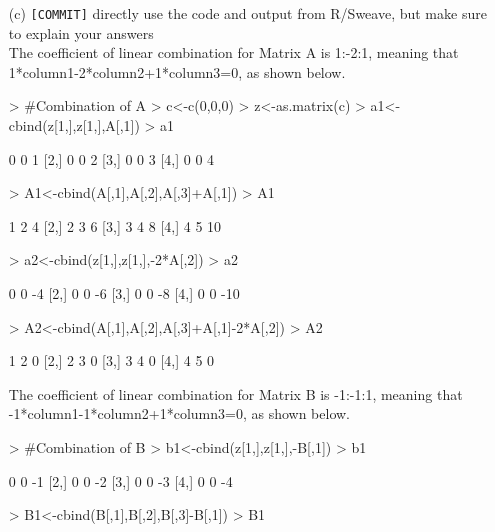 \documentclass[12pt]{article}
\begin{document}
\begin{itemize}
    \item[(c)] \verb+[COMMIT]+   directly use the code and output from R/Sweave, but make sure
        to explain your answers\\
The coefficient of linear combination for Matrix A is 1:-2:1, meaning that 1*column1-2*column2+1*column3=0, as shown below.
\begin{Schunk}
\begin{Sinput}
> #Combination of A
> c<-c(0,0,0)
> z<-as.matrix(c)
> a1<-cbind(z[1,],z[1,],A[,1])
> a1
\end{Sinput}
\begin{Soutput}
     [,1] [,2] [,3]
[1,]    0    0    1
[2,]    0    0    2
[3,]    0    0    3
[4,]    0    0    4
\end{Soutput}
\begin{Sinput}
> A1<-cbind(A[,1],A[,2],A[,3]+A[,1])
> A1
\end{Sinput}
\begin{Soutput}
     [,1] [,2] [,3]
[1,]    1    2    4
[2,]    2    3    6
[3,]    3    4    8
[4,]    4    5   10
\end{Soutput}
\begin{Sinput}
> a2<-cbind(z[1,],z[1,],-2*A[,2])
> a2
\end{Sinput}
\begin{Soutput}
     [,1] [,2] [,3]
[1,]    0    0   -4
[2,]    0    0   -6
[3,]    0    0   -8
[4,]    0    0  -10
\end{Soutput}
\begin{Sinput}
> A2<-cbind(A[,1],A[,2],A[,3]+A[,1]-2*A[,2])
> A2
\end{Sinput}
\begin{Soutput}
     [,1] [,2] [,3]
[1,]    1    2    0
[2,]    2    3    0
[3,]    3    4    0
[4,]    4    5    0
\end{Soutput}
\end{Schunk}
The coefficient of linear combination for Matrix B is -1:-1:1, meaning that -1*column1-1*column2+1*column3=0, as shown below.
\begin{Schunk}
\begin{Sinput}
> #Combination of B
> b1<-cbind(z[1,],z[1,],-B[,1])
> b1
\end{Sinput}
\begin{Soutput}
     [,1] [,2] [,3]
[1,]    0    0   -1
[2,]    0    0   -2
[3,]    0    0   -3
[4,]    0    0   -4
\end{Soutput}
\begin{Sinput}
> B1<-cbind(B[,1],B[,2],B[,3]-B[,1])
> B1
\end{Sinput}

\end{Schunk}
\end{itemize}
\end{document}
